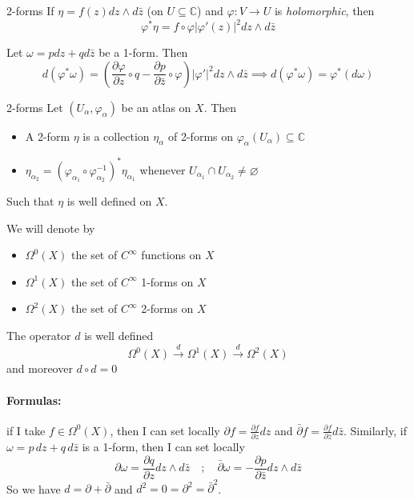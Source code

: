 \begin{definition}{2-forms}
    If \(\eta = f{(z)}dz \wedge d\bar{z}\) (on \(U \subseteq \mathbb{C} \)) and
    \(\varphi : V \to U\) is \emph{holomorphic}, then
    \[
      \varphi ^{*} \eta = f \circ \varphi \left| \varphi '{(z)} \right| ^2 dz
      \wedge d\bar{z}
    \]
\end{definition}
\begin{remark}{}
    Let \(\omega = p dz + q d\bar{z}\) be a 1-form. Then
    \[
      d {\left( \varphi ^{*} \omega \right)} = {\left( \frac{\partial \varphi
      }{\partial z} \circ q  - \frac{\partial p}{\partial \bar{z}}
\circ \varphi \right)} \left| \varphi ' \right| ^2 dz \wedge d\bar{z}
\implies d {\left( \varphi ^{*}\omega \right)} = \varphi ^{*}{(d\omega)}
    \]
\end{remark}


\begin{definition}{2-forms}
    Let \({(U_{\alpha} , \varphi _{\alpha} )}\) be an atlas on \(X\). Then
\begin{itemize}[label = \bullet]
    \item A 2-form \(\eta\) is a collection \(\eta_{\alpha} \) of 2-forms on
        \(\varphi _{\alpha} {(U_{\alpha} )} \subseteq \mathbb{C} \) 
    \item \(\eta_{\alpha_{2}} = {\left( \varphi _{\alpha_{1}} \circ \varphi
        _{\alpha_{2}}^{-1} \right)}^{*} \eta_{\alpha_{1}}  \) whenever
        \(U_{\alpha_{1}} \cap U_{\alpha_{2}} \neq \varnothing\) 
\end{itemize}
    Such that \(\eta\) is well defined on \(X\).
\end{definition}

We will denote by
\begin{itemize}[label = --]
    \item \(\Omega^{0}{(X)}\) the set of \(C^{\infty}\) functions on
\(X\)
    \item \(\Omega^{1}{(X)}\) the set of \(C^{\infty}\) 1-forms on \(X\) 
    \item \(\Omega^{2}{(X)}\) the set of \(C^{\infty}\) 2-forms on \(X\) 
\end{itemize}

The operator \(d\) is well defined
\[
  \Omega^{0}{(X)} \overset{d}{\to} \Omega^{1}{(X)} \overset{d}{\to}
  \Omega^{2}{(X)}
\]
and moreover \(d\circ d = 0\) 

\paragraph{Formulas:} if I take \(f \in \Omega^{0}{(X)}\), then I can set
locally \(\partial f = \frac{\partial f}{\partial z} dz\) and
\(\bar{\partial} f = \frac{\partial f}{\partial \bar{z}}
d\bar{z}\). Similarly, if \(\omega = p\, dz + q\, d\bar{z}\) is a 1-form,
then I can set locally
\[
  \partial \omega = \frac{\partial q}{\partial z} dz \wedge d\bar{z} \quad
  ; \quad \bar{\partial} \omega = -\frac{\partial p}{\partial \bar{z}}
  dz \wedge d\bar{z}
\]
So we have \(d = \partial + \bar{\partial}\) and \(d^2 = 0 = \partial^2 =
\bar{\partial}^2\).

